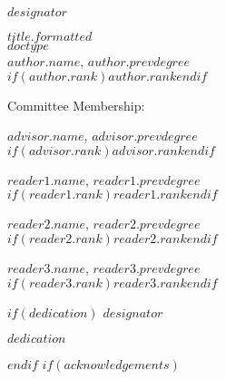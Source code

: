 \documentclass[12pt,letterpaper,oneside]{report}
\begin{document}
	\thispagestyle{empty}
	\setcounter{page}{3}
	\noindent $designator$
	\vfill
	\begin{center}
	    \MakeUppercase{$title.formatted$}\\[10pt]
	    \MakeUppercase{$doctype$}\\[10pt]
	    
	    \begingroup
  \singlespace
    $author.name$, $author.prevdegree$\\ 
    $if(author.rank)$$author.rank$$endif$
    \par
  \endgroup
  
	\bigskip\medskip
	Committee Membership:
	\bigskip\medskip
	
	\begingroup
  \singlespace
    $advisor.name$, $advisor.prevdegree$\\ 
    $if(advisor.rank)$$advisor.rank$$endif$
    \par
  \endgroup
  \bigskip\bigskip
  
  \begingroup
  \singlespace
    $reader1.name$, $reader1.prevdegree$\\ 
    $if(reader1.rank)$$reader1.rank$$endif$
    \par
  \endgroup
  \bigskip\bigskip
  
  \begingroup
  \singlespace
    $reader2.name$, $reader2.prevdegree$\\ 
    $if(reader2.rank)$$reader2.rank$$endif$
    \par
  \endgroup
  \bigskip\bigskip
  
  \begingroup
  \singlespace
    $reader3.name$, $reader3.prevdegree$\\ 
    $if(reader3.rank)$$reader3.rank$$endif$
    \par
  \endgroup
	\end{center}
	\vfill
	\newpage
$if(dedication)$
       \noindent 
       $designator$
       \vfill
       \begin{center}
	   \em{$dedication$}
	   \end{center}
	   \vfill
      \newpage
$endif$
$if(acknowledgements)$
\newenvironment{acknowledgements}{\ackhead}{\acktail}
\newenvironment{acknowledgments}{\ackhead}{\acktail}
\end{document}
